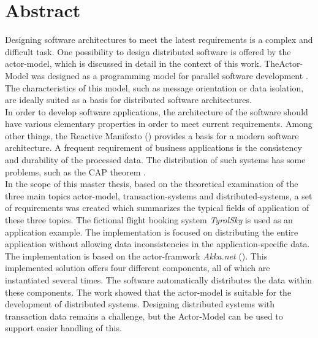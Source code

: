
\chapter*{Abstract}
Designing software architectures to meet the latest requirements is a complex and difficult task. One possibility to design distributed software is offered by the actor-model, which is discussed in detail in the context of this work. TheActor-Model was designed as a programming model for parallel software development \citep{hewitt1973session}. The characteristics of this model, such as message orientation or data isolation, are ideally suited as a basis for distributed software architectures. \\
In order to develop software applications, the architecture of the software should have various elementary properties in order to meet current requirements. Among other things, the Reactive Manifesto (\cite{reactiveManifesto}) provides a basis for a modern software architecture. 
A frequent requirement of business applications is the consistency and durability of the processed data. The distribution of such systems has some problems, such as the CAP theorem \citep{gilbertPerspectiveCAPTheorem2012}. \\
In the scope of this master thesis, based on the theoretical examination of the three main topics actor-model, transaction-systems and distributed-systems, a set of requirements was created which summarizes the typical fields of application of these three topics. The fictional flight booking system \textit{TyrolSky} is used as an application example. The implementation is focused on distributing the entire application without allowing data inconsistencies in the application-specific data. \\
The implementation is based on the actor-framwork \textit{Akka.net} (\cite{Akka.netCommunityAkka.NETDocumentation}). This implemented solution offers four different components, all of which are instantiated several times. The software automatically distributes the data within these components.
The work showed that the actor-model is suitable for the development of distributed systems. Designing distributed systems with transaction data remains a challenge, but the Actor-Model can be used to support easier handling of this.


\cleardoublepage
{} %